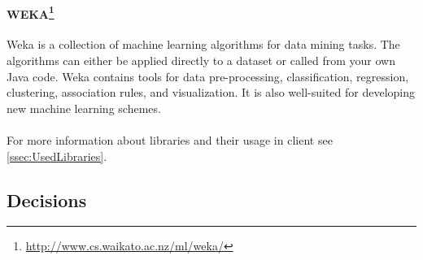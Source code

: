 
\paragraph{WEKA\footnote{\url{http://www.cs.waikato.ac.nz/ml/weka/}}}
Weka is a collection of machine learning algorithms for data mining tasks.
The algorithms can either be applied directly to a dataset or called from your
own Java code. Weka contains tools for data pre-processing, classification,
regression, clustering, association rules, and visualization. It is also
well-suited for developing new machine learning schemes.

\paragraph{} For more information about libraries and their usage in client see
\ref{ssec:UsedLibraries}.

\subsection{Decisions}


